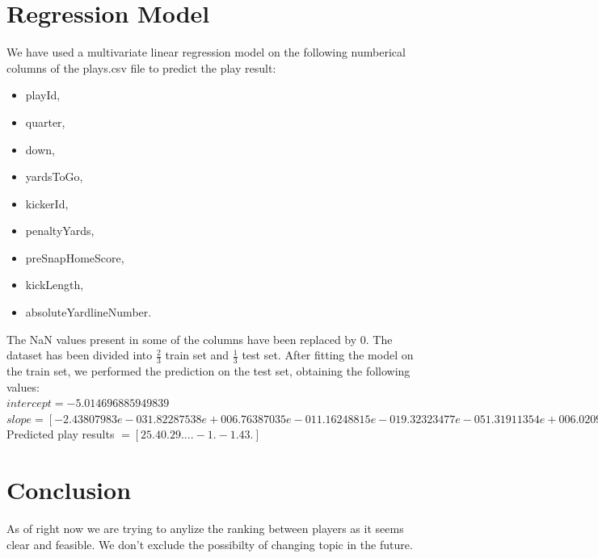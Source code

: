 \documentclass{article}
\begin{document}
\section{Regression Model}
We have used a multivariate linear regression model on the following numberical columns of the plays.csv file to predict the play result:
\begin{itemize}
	\item playId,
	\item quarter,
	\item down,
	\item yardsToGo,
	\item kickerId,
	\item penaltyYards,
	\item preSnapHomeScore,
	\item kickLength,
	\item absoluteYardlineNumber.
\end{itemize}
The NaN values present in some of the columns have been replaced by 0.
The dataset has been divided into $\frac{2}{3}$ train set and $\frac{1}{3}$ test set. After fitting the model on the train set, we performed the prediction on the test set, obtaining the following values:\\
$intercept = -5.014696885949839 $\\
$slope = [-2.43807983e-03  1.82287538e+00  6.76387035e-01  1.16248815e-01
  9.32323477e-05  1.31911354e+00  6.02097301e-02  5.91721982e-01
 -2.49419762e-03]$\\
Predicted play results $= [25. 40. 29. ... -1. -1. 43.]$
\section{Conclusion}
As of right now we are trying to anylize the ranking between players as it seems clear and feasible. We don't exclude the possibilty of changing topic in the future.
\end{document}
